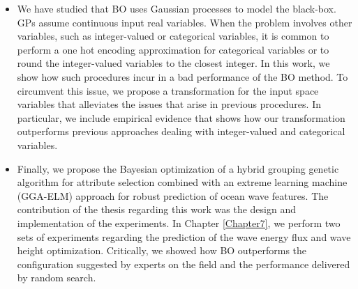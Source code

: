 \begin{itemize}
    \item We have studied that BO uses Gaussian processes to model the black-box. GPs assume continuous input real variables. When the problem involves other variables, such as integer-valued or categorical variables, it is common to perform a one hot encoding approximation for categorical variables or to round the integer-valued variables to the closest integer. In this work, we show how such procedures incur in a bad performance of the BO method. To circumvent this issue, we propose a transformation for the input space variables that alleviates the issues that arise in previous procedures. In particular, we include empirical evidence that shows how our transformation outperforms previous approaches dealing with integer-valued and categorical variables.
    \item Finally, we propose the Bayesian optimization of a hybrid grouping genetic algorithm for attribute selection combined with an extreme learning machine (GGA-ELM) approach for robust prediction of ocean wave features. The contribution of the thesis regarding this work was the design and implementation of the experiments. In Chapter \ref{Chapter7}, we perform two sets of experiments regarding the prediction of the wave energy flux and wave height optimization. Critically, we showed how BO outperforms the configuration suggested by experts on the field and the performance delivered by random search.
\end{itemize}

